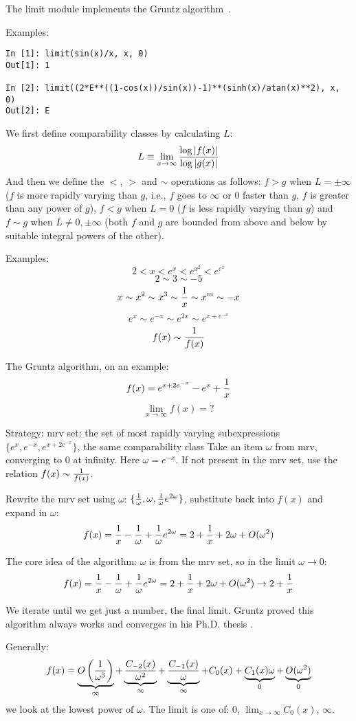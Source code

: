 The limit module implements the Gruntz algorithm~\cite{Gruntz1996limits}.

Examples:
\begin{verbatim}
In [1]: limit(sin(x)/x, x, 0)
Out[1]: 1

In [2]: limit((2*E**((1-cos(x))/sin(x))-1)**(sinh(x)/atan(x)**2), x, 0)
Out[2]: E
\end{verbatim}

We first define comparability classes by calculating $L$:
\begin{equation}
L\equiv \lim_{x\to\infty} {\log |f(x)| \over \log |g(x)|}
\end{equation}
And then we define the $<$, $>$ and $\sim$ operations as follows: $f>g$ when
$L=\pm\infty$ ($f$ is more rapidly varying than $g$, i.e., $f$ goes to $\infty$
or $0$ faster than $g$, $f$ is greater than any power of $g$), $f<g$ when $L=0$
($f$ is less rapidly varying than $g$) and $f\sim g$ when $L\neq 0,\pm\infty$
(both $f$ and $g$ are bounded from above and below by suitable integral powers
of the other).

Examples:
$$2 < x < e^x < e^{x^2} < e^{e^x}$$
$$2\sim 3\sim -5$$
$$x\sim x^2\sim x^3\sim {1\over x}\sim x^m\sim -x$$
$$e^x\sim e^{-x}\sim e^{2x}\sim e^{x+e^{-x}}$$
$$f(x)\sim{1\over f(x)}$$

The Gruntz algorithm, on an example:
$$f(x) = e^{x+2e^{-x}} - e^x + {1\over x}$$
$$\lim_{x\to\infty} f(x) = ?$$

Strategy:
mrv set: the set of most rapidly varying subexpressions
$\{e^x, e^{-x}, e^{x+2e^{-x}}\}$, the same comparability class
Take an item $\omega$ from mrv, converging to 0 at infinity. Here
$\omega=e^{-x}$. If not present in the mrv set, use the relation
$f(x)\sim {1\over f(x)}$.

Rewrite the mrv set using $\omega$: $\{{1\over\omega}, \omega,
{1\over\omega}e^{2\omega}\}$, substitute back into $f(x)$ and expand in
$\omega$:
$$f(x) = {1\over x}-{1\over\omega}+{1\over\omega}e^{2\omega}
    = 2+{1\over x} + 2\omega + O(\omega^2)$$

The core idea of the algorithm: $\omega$ is from the mrv set, so in the limit
$\omega\to0$:
$$f(x) = {1\over x}-{1\over\omega}+{1\over\omega}e^{2\omega}
    = 2+{1\over x} + 2\omega + O(\omega^2)
    \to 2 + {1\over x}$$

We iterate until we get just a number, the final limit. Gruntz proved this
algorithm always works and converges in his Ph.D. thesis
\cite{Gruntz1996limits}.

Generally:
$$ f(x) = \underbrace{O\left({1\over \omega^3}\right)}_\infty
    + \underbrace{C_{-2}(x)\over \omega^2}_\infty
    + \underbrace{C_{-1}(x)\over \omega}_\infty
    + {C_{0}(x)}
    + \underbrace{C_{1}(x)\omega}_0
    + \underbrace{O(\omega^2)}_0
$$
we look at the lowest power of $\omega$. The limit is one of: $0$,
$\lim_{x\to\infty} C_0(x)$, $\infty$.
